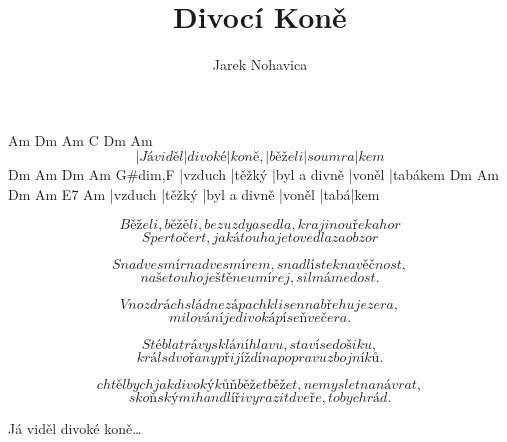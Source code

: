 \documentclass{song}
\title{Divocí Koně}
\author{Jarek Nohavica}
\begin{document}
\strophe
   Am        Dm      Am     C       Dm     Am
\[ |Já viděl |divoké |koně, |běželi |soumra|kem \]
Dm      Am     Dm           Am     G\#dim,F
|vzduch |těžký |byl a divně |voněl |tabákem
Dm      Am     Dm           Am     E7  Am
|vzduch |těžký |byl a divně |voněl |tabá|kem
\endstrophe

\strophe*
\[ Běželi, běžěli, bez uzdy a sedla,krajinou řek a hor \]
\[ Sper to čert, jaká touha je to vedla za obzor \]
\endstrophe

\strophe*
\[ Snad vesmír nad vesmírem, snad lístek na věčnost, \]
\[ naše touho ještě neumírej, sil máme dost. \]
\endstrophe

\strophe*
\[ V nozdrách sládne zápach klisen na břehu jezera, \]
\[ milování je divoká píseň večera. \]
\endstrophe

\strophe*
\[ Stébla trávy sklání hlavu , staví se do šiku, \]
\[ král s dvořany přijíždí na popravu zbojníků. \]
\endstrophe

\strophe*
\[ chtěl bych jak divoký kůň běžet běžet, nemyslet na návrat, \]
\[ s koňskými handlíři vyrazit dveře, to bych rád. \]
\endstrophe

Já viděl divoké koně\ldots
\end{document}
